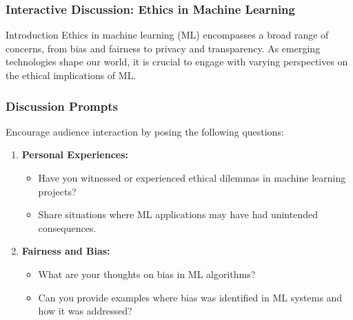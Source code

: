 \documentclass[aspectratio=169]{beamer}
\begin{document}
\begin{frame}[fragile]
    \frametitle{Interactive Discussion: Ethics in Machine Learning}
    \begin{block}{Introduction}
        Ethics in machine learning (ML) encompasses a broad range of concerns, from bias and fairness to privacy and transparency. As emerging technologies shape our world, it is crucial to engage with varying perspectives on the ethical implications of ML.
    \end{block}
\end{frame}

\begin{frame}[fragile]
    \frametitle{Discussion Prompts}
    Encourage audience interaction by posing the following questions:
    \begin{enumerate}
        \item \textbf{Personal Experiences:} 
            \begin{itemize}
                \item Have you witnessed or experienced ethical dilemmas in machine learning projects?
                \item Share situations where ML applications may have had unintended consequences.
            \end{itemize}
        \item \textbf{Fairness and Bias:}
            \begin{itemize}
                \item What are your thoughts on bias in ML algorithms?
                \item Can you provide examples where bias was identified in ML systems and how it was addressed?
            \end{itemize}
    \end{enumerate}
\end{frame}
\end{document}

